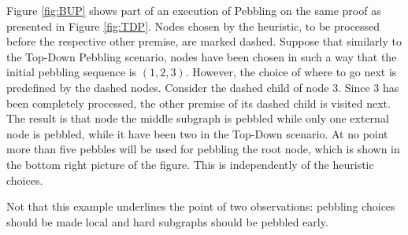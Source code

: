 \begin{example}
Figure \ref{fig:BUP} shows part of an execution of  Pebbling on the same proof as presented in Figure \ref{fig:TDP}.
Nodes chosen by the heuristic, to be processed before the respective other premise, are marked dashed. 
Suppose that similarly to the Top-Down Pebbling scenario, nodes have been chosen in such a way that the initial pebbling sequence is $(1,2,3)$.
However, the choice of where to go next is predefined by the dashed nodes. 
Consider the dashed child of node $3$. 
Since $3$ has been completely processed, the other premise of its dashed child is visited next. 
The result is that node the middle subgraph is pebbled while only one external node is pebbled, while it have been two in the Top-Down scenario. 
At no point more than five pebbles will be used for pebbling the root node, which is shown in the bottom right picture of the figure. This is independently of the heuristic choices.

Not that this example underlines the point of two observations: pebbling choices should be made local and hard subgraphs should be pebbled early.


\end{example}
